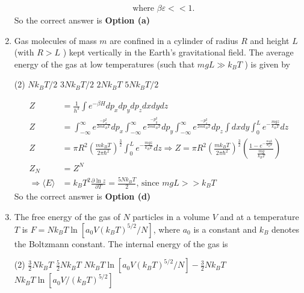 \begin{enumerate}
\begin{answer}
\begin{align*}
&\text{	where }\beta \varepsilon<<1.
	\end{align*}
		So the correct answer is \textbf{Option (a)}
\end{answer}
\item 	Gas molecules of mass $m$ are confined in a cylinder of radius $R$ and height $L$ (with $R>L$ ) kept vertically in the Earth's gravitational field. The average energy of the gas at low temperatures (such that $m g L \gg k_{B} T$ ) is given by
	 \begin{tasks}(2)
		\task[\textbf{a.}]$N k_{B} T / 2$
		\task[\textbf{b.}]$3 N k_{B} T / 2$
		\task[\textbf{c.}]$2 N k_{B} T$
		\task[\textbf{d.}] $5 N k_{B} T / 2$
	\end{tasks}
\begin{answer}
	\begin{align*}
	Z&=\frac{1}{h^{3}} \int e^{-\beta H} d p_{x} d p_{y} d p_{z} d x d y d z\\
	Z&=\int_{-\infty}^{\infty} e^{\frac{-p_{x}^{2}}{2 m k_{B} T}} d p_{x} \int_{-\infty}^{\infty} e^{\frac{-p_{y}^{2}}{2 m k_{B} T}} d p_{y} \int_{-\infty}^{\infty} e^{\frac{-p_{z}^{2}}{2 m k_{B} T}} d p_{z} \int d x d y \int_{0}^{L} e^{-\frac{m g z}{k_{B} T}} d z\\
	Z&=\pi R^{2}\left(\frac{m k_{B} T}{2 \pi \hbar^{2}}\right)^{\frac{3}{2}} \int_{0}^{L} e^{-\frac{m g z}{k_{B} T}} d z \Rightarrow Z=\pi R^{2}\left(\frac{m k_{B} T}{2 \pi \hbar^{2}}\right)^{\frac{3}{2}}\left(\frac{1-e^{-\frac{m g L}{k_{B} T}}}{\frac{m g}{k_{B} T}}\right)\\
	Z_{N}&=Z^{N}\\
	\Rightarrow\langle E\rangle&=k_{B} T^{2} \frac{\partial \ln z}{\partial T}=\frac{5 N k_{B} T}{2} \text {, since } m g L>>k_{B} T
	\end{align*}
			So the correct answer is \textbf{Option (d)}
\end{answer}
\item 	The free energy of the gas of $N$ particles in a volume $V$ and at a temperature $T$ is $F=N k_{B} T \ln \left[a_{0} V\left(k_{B} T\right)^{5 / 2} / N\right]$, where $a_{0}$ is a constant and $k_{B}$ denotes the Boltzmann constant. The internal energy of the gas is
 \begin{tasks}(2)
	\task[\textbf{a.}]$\frac{3}{2} N k_{B} T$
	\task[\textbf{b.}]$\frac{5}{2} N k_{B} T$
	\task[\textbf{c.}]$N k_{B} T \ln \left[a_{0} V\left(k_{B} T\right)^{5 / 2} / N\right]-\frac{3}{2} N k_{B} T$
	\task[\textbf{d.}]  $N k_{B} T \ln \left[a_{0} V /\left(k_{B} T\right)^{5 / 2}\right]$
\end{tasks}	

\end{enumerate}
